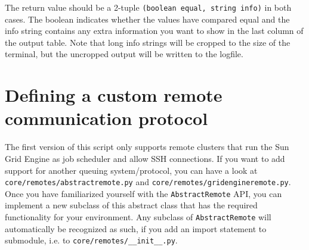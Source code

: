 \documentclass[a4paper,12pt]{scrartcl}
\begin{document}
The return value should be a 2-tuple \texttt{(boolean equal, string info)} in both cases. The boolean indicates
whether the values have compared equal and the info string contains any extra information you want to show in the
last column of the output table. Note that long info strings will be cropped to the size of the terminal, but the
uncropped output will be written to the logfile.

\section{Defining a custom remote communication protocol}
The first version of this script only supports remote clusters that run the Sun Grid Engine as job scheduler and
allow SSH connections. If you want to add support for another queuing system/protocol, you can have a look at
\texttt{core/remotes/abstractremote.py} and \texttt{core/remotes/gridengineremote.py}. Once you have familiarized
yourself with the \texttt{AbstractRemote} API, you can implement a new subclass of this abstract class that has the required
functionality for your environment. Any subclass of \texttt{AbstractRemote} will automatically be recognized as such,
if you add an import statement to submodule, i.e. to \texttt{core/remotes/\_\_init\_\_.py}.
\end{document}
